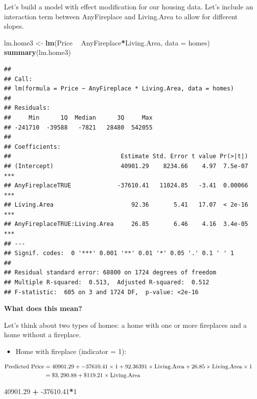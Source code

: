 \documentclass[]{book}
\newenvironment{Shaded}{\begin{snugshade}}{\end{snugshade}}
\newcommand{\DataTypeTok}[1]{\textcolor[rgb]{0.13,0.29,0.53}{#1}}
\newcommand{\DecValTok}[1]{\textcolor[rgb]{0.00,0.00,0.81}{#1}}
\newcommand{\FloatTok}[1]{\textcolor[rgb]{0.00,0.00,0.81}{#1}}
\newcommand{\KeywordTok}[1]{\textcolor[rgb]{0.13,0.29,0.53}{\textbf{#1}}}
\newcommand{\NormalTok}[1]{#1}
\newcommand{\OperatorTok}[1]{\textcolor[rgb]{0.81,0.36,0.00}{\textbf{#1}}}
\newcommand{\StringTok}[1]{\textcolor[rgb]{0.31,0.60,0.02}{#1}}
\providecommand{\tightlist}{%
  \setlength{\itemsep}{0pt}\setlength{\parskip}{0pt}}
\begin{document}
Let's build a model with effect modification for our housing data. Let's include an interaction term between AnyFireplace and Living.Area to allow for different slopes.

\begin{Shaded}
\begin{Highlighting}[]
\NormalTok{lm.home3 <-}\StringTok{ }\KeywordTok{lm}\NormalTok{(Price }\OperatorTok{~}\StringTok{ }\NormalTok{AnyFireplace}\OperatorTok{*}\NormalTok{Living.Area, }\DataTypeTok{data =}\NormalTok{ homes)}
\KeywordTok{summary}\NormalTok{(lm.home3)}
\end{Highlighting}
\end{Shaded}

\begin{verbatim}
## 
## Call:
## lm(formula = Price ~ AnyFireplace * Living.Area, data = homes)
## 
## Residuals:
##     Min      1Q  Median      3Q     Max 
## -241710  -39588   -7821   28480  542055 
## 
## Coefficients:
##                               Estimate Std. Error t value Pr(>|t|)    
## (Intercept)                   40901.29    8234.66    4.97  7.5e-07 ***
## AnyFireplaceTRUE             -37610.41   11024.85   -3.41  0.00066 ***
## Living.Area                      92.36       5.41   17.07  < 2e-16 ***
## AnyFireplaceTRUE:Living.Area     26.85       6.46    4.16  3.4e-05 ***
## ---
## Signif. codes:  0 '***' 0.001 '**' 0.01 '*' 0.05 '.' 0.1 ' ' 1
## 
## Residual standard error: 68800 on 1724 degrees of freedom
## Multiple R-squared:  0.513,  Adjusted R-squared:  0.512 
## F-statistic:  605 on 3 and 1724 DF,  p-value: <2e-16
\end{verbatim}

\textbf{What does this mean?}

Let's think about two types of homes: a home with one or more fireplaces and a home without a fireplace.

\begin{itemize}
\tightlist
\item
  Home with fireplace (indicator = 1):
\end{itemize}

\begin{align*}
\hbox{Predicted Price} &= 40901.29 + -37610.41 \times 1 + 92.36391 \times \hbox{Living.Area} + 26.85 \times \hbox{Living.Area} \times 1 \\
& = \$3,290.88 + \$119.21 \times \hbox{Living.Area}
\end{align*}

\begin{Shaded}
\begin{Highlighting}[]
\FloatTok{40901.29} \OperatorTok{+}\StringTok{ }\FloatTok{-37610.41}\OperatorTok{*}\DecValTok{1}
\end{Highlighting}
\end{Shaded}
\end{document}
